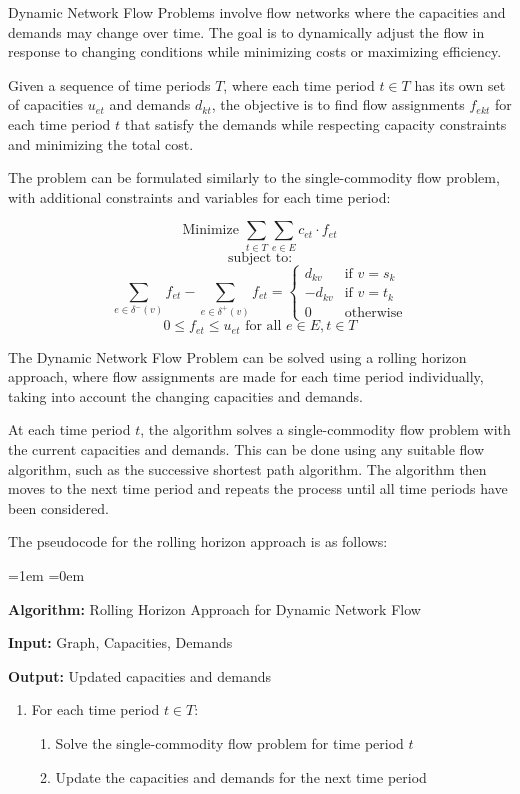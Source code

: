 \documentclass[12pt]{book} %
\begin{document}
Dynamic Network Flow Problems involve flow networks where the capacities and demands may change over time. The goal is to dynamically adjust the flow in response to changing conditions while minimizing costs or maximizing efficiency.

Given a sequence of time periods \(T\), where each time period \(t \in T\) has its own set of capacities \(u_{et}\) and demands \(d_{kt}\), the objective is to find flow assignments \(f_{ekt}\) for each time period \(t\) that satisfy the demands while respecting capacity constraints and minimizing the total cost.

The problem can be formulated similarly to the single-commodity flow problem, with additional constraints and variables for each time period:

\[
\text{Minimize } \sum_{t \in T} \sum_{e \in E} c_{et} \cdot f_{et}
\]
\[
\text{subject to:}
\]
\[
\sum_{e \in \delta^-(v)} f_{et} - \sum_{e \in \delta^+(v)} f_{et} = 
\begin{cases} 
d_{kv} & \text{if } v = s_k \\
-d_{kv} & \text{if } v = t_k \\
0 & \text{otherwise}
\end{cases}
\]
\[
0 \leq f_{et} \leq u_{et} \text{ for all } e \in E, t \in T
\]

The Dynamic Network Flow Problem can be solved using a rolling horizon approach, where flow assignments are made for each time period individually, taking into account the changing capacities and demands.

At each time period \(t\), the algorithm solves a single-commodity flow problem with the current capacities and demands. This can be done using any suitable flow algorithm, such as the successive shortest path algorithm. The algorithm then moves to the next time period and repeats the process until all time periods have been considered.

The pseudocode for the rolling horizon approach is as follows:
\FloatBarrier
\begin{list}{}{\leftmargin=1em \itemindent=0em}
\item \textbf{Algorithm:} Rolling Horizon Approach for Dynamic Network Flow
\item \textbf{Input:} Graph, Capacities, Demands
\item \textbf{Output:} Updated capacities and demands
\end{list}
\begin{enumerate}
\item For each time period $t \in T$:
\begin{enumerate}
\item Solve the single-commodity flow problem for time period $t$
\item Update the capacities and demands for the next time period
\end{enumerate}
\end{enumerate}
\FloatBarrier
\end{document}
